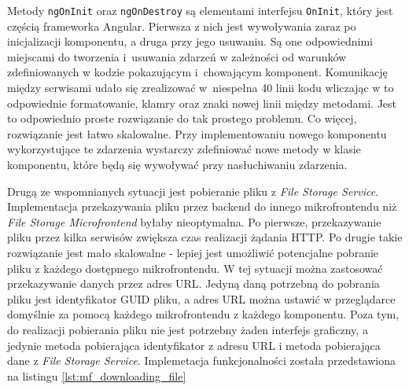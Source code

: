 \documentclass{SGGW-thesis}
\begin{document}
{  

  

  Metody \lstinline{ngOnInit} oraz \lstinline{ngOnDestroy} są elementami interfejsu \lstinline{OnInit}, który jest częścią frameworka Angular. Pierwsza z nich jest wywoływania zaraz po inicjalizacji komponentu, a druga przy jego usuwaniu. Są one odpowiednimi miejscami do tworzenia i~usuwania zdarzeń w zależności od warunków zdefiniowanych w kodzie pokazującym i~chowającym komponent. Komunikację między serwisami udało się zrealizować w~niespełna 40 linii kodu wliczając w to odpowiednie formatowanie, klamry oraz znaki nowej linii między metodami. Jest to odpowiednio proste rozwiązanie do tak prostego problemu. Co więcej, rozwiązanie jest łatwo skalowalne. Przy implementowaniu nowego komponentu wykorzystujące te zdarzenia wystarczy zdefiniować nowe metody w klasie komponentu, które będą się wywoływać przy nasłuchiwaniu zdarzenia.

  Drugą ze wspomnianych sytuacji jest pobieranie pliku z \textit{File Storage Service}. Implementacja przekazywania pliku przez backend do innego mikrofrontendu niż \textit{File Storage Microfrontend} byłaby nieoptymalna. Po pierwsze, przekazywanie pliku przez kilka serwisów zwiększa czas realizacji żądania HTTP. Po drugie takie rozwiązanie jest mało skalowalne - lepiej jest umożliwić potencjalne pobranie pliku z każdego dostępnego mikrofrontendu. W tej sytuacji można zastosować przekazywanie danych przez adres URL. Jedyną daną potrzebną do pobrania pliku jest identyfikator GUID pliku, a adres URL można ustawić w przeglądarce domyślnie za pomocą każdego mikrofrontendu z każdego komponentu. Poza tym, do realizacji pobierania pliku nie jest potrzebny żaden interfejs graficzny, a jedynie metoda pobierająca identyfikator z adresu URL i metoda pobierająca dane z \textit{File Storage Service}. Implemetacja funkcjonalności została przedstawiona na listingu \cref{lst:mf_downloading_file}

  

}
\end{document}
